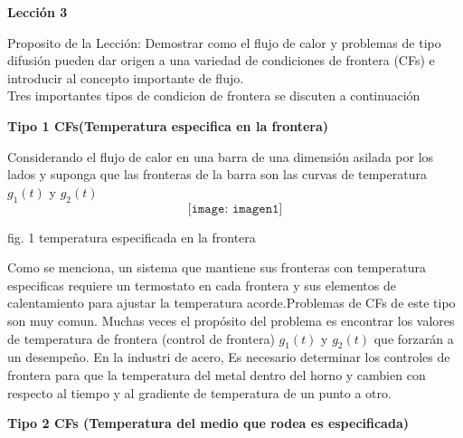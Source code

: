 \documentclass[10pt,a4paper]{report}
\begin{document}
\Large \begin{center}
 \Large \textbf {Lección 3}
\end{center} 
Proposito de la Lección: Demostrar como el flujo de calor y problemas de tipo difusión pueden dar origen a una variedad de condiciones de frontera (CFs) e introducir al concepto importante de flujo.
\\ Tres importantes tipos de condicion de frontera se discuten a continuación
\\
\begin{center}
\textbf {Tipo 1 CFs(Temperatura especifica en la frontera)}
\end{center}
Considerando el flujo de calor en una barra de una dimensión asilada por los lados y suponga que las fronteras de la barra son las curvas de temperatura $g_1(t)$ y $g_2(t)$
\\ $$\texttt{[image: imagen1]}$$
\begin{center}
{\small fig. 1 temperatura especificada en la frontera}
\end{center}
Como se menciona, un sistema que mantiene sus fronteras con temperatura especificas requiere un termostato en cada frontera y sus elementos de calentamiento para ajustar la temperatura acorde.Problemas de CFs de este tipo son muy comun. Muchas veces el propósito del problema es encontrar los valores de temperatura de frontera (control de frontera) $g_1(t)$ y $g_2(t)$ que forzarán a un desempeño. En la industri de acero, Es necesario determinar los controles de frontera para que la temperatura del metal dentro del horno y cambien con respecto al tiempo y al gradiente de temperatura de un punto a otro.
\newpage
\begin{center}
\textbf {Tipo 2 CFs (Temperatura del medio que rodea es especificada)}
\end{center}
\end{document}

